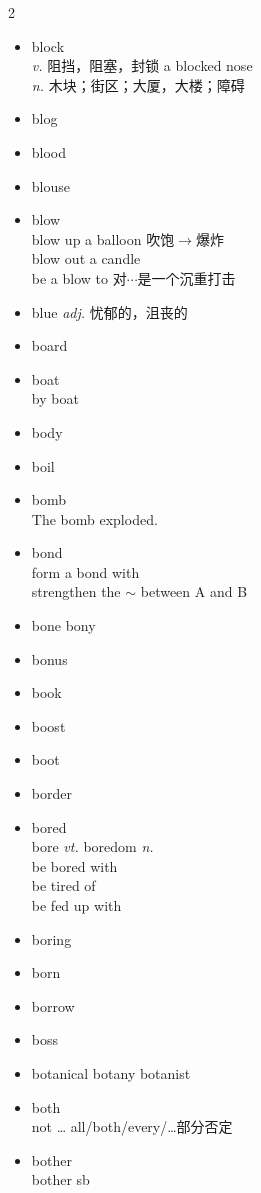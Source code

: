 \documentclass[../../book.tex]{subfiles}
\begin{document}
\begin{multicols}{2}
\begin{itemize}
\\turn a blind eye to
\\turn a deaf ear to
\item[-] block
\\\emph{v.} 阻挡，阻塞，封锁 a blocked nose
\\\emph{n.} 木块；街区；大厦，大楼；障碍
\item[-] blog
\item[-] blood
\item[-] blouse
\item[-] blow
\\blow up a balloon 吹饱$\rightarrow$爆炸
\\blow out a candle
\\be a blow to 对$\cdots$是一个沉重打击
\item[-] blue \emph{adj.} 忧郁的，沮丧的
\item[-] board
\item[-] boat
\\by boat
\item[-] body
\item[-] boil
\item[-] bomb
\\The bomb exploded.
\item[-] bond
\\form a bond with
\\strengthen the $\sim$ between A and B
\item[-] bone \phantom{a} bony
\item[-] bonus
\item[-] book
\item[-] boost
\item[-] boot
\item[-] border
\item[-] bored
\\bore \emph{vt.} boredom \emph{n.}
\\be bored with
\\be tired of
\\be fed up with
\item[-] boring
\item[-] born
\item[-] borrow
\item[-] boss
\item[-] botanical \phantom{a} botany botanist
\item[-] both
\\not \ldots{} all/both/every/\ldots 部分否定
\item[-] bother
\\bother sb

\end{itemize}
\end{multicols}
\end{document}
